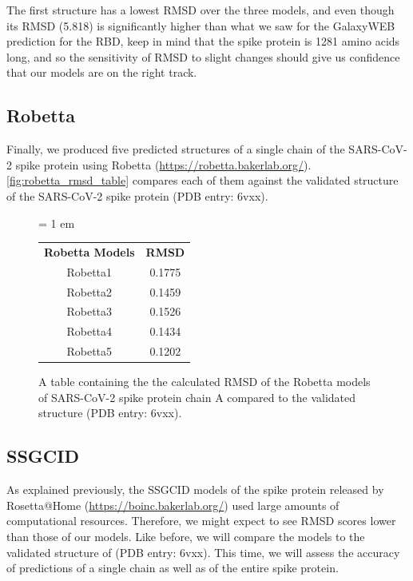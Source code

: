 The first structure has a lowest RMSD over the three models, and even though its RMSD (5.818) is significantly higher than what we saw for the GalaxyWEB prediction for the RBD, keep in mind that the spike protein is 1281 amino acids long, and so the sensitivity of RMSD to slight changes should give us confidence that our models are on the right track.

\FloatBarrier
{}
\subsection{Robetta}

Finally, we produced five predicted structures of a single chain of the SARS-CoV-2 spike protein using Robetta (\url{https://robetta.bakerlab.org/}). \autoref{fig:robetta_rmsd_table} compares each of them against the validated structure of the SARS-CoV-2 spike protein (PDB entry: 6vxx).

\begin{figure}[h]
	\centering
	\tabcolsep = 1 em
	\mySfFamily
	\begin{tabular}{c c}
		\textbf{Robetta Models} & \textbf{RMSD} \\
		Robetta1 & 0.1775 \\
		Robetta2 & 0.1459 \\
		Robetta3 & 0.1526 \\
		Robetta4 & 0.1434 \\
		Robetta5 & 0.1202 \\
	\end{tabular}
	\caption{A table containing the the calculated RMSD of the Robetta models of SARS-CoV-2 spike protein chain A compared to the validated structure (PDB entry: 6vxx).}
	\label{fig:robetta_rmsd_table}
\end{figure}

\begin{qbox}\end{qbox}

\FloatBarrier
{}
\subsection{SSGCID}

As explained previously, the SSGCID models of the spike protein released by Rosetta@Home (\url{https://boinc.bakerlab.org/}) used large amounts of computational resources. Therefore, we might expect to see RMSD scores lower than those of our models. Like before, we will compare the models to the validated structure of (PDB entry: 6vxx). This time, we will assess the accuracy of predictions of a single chain as well as of the entire spike protein.

